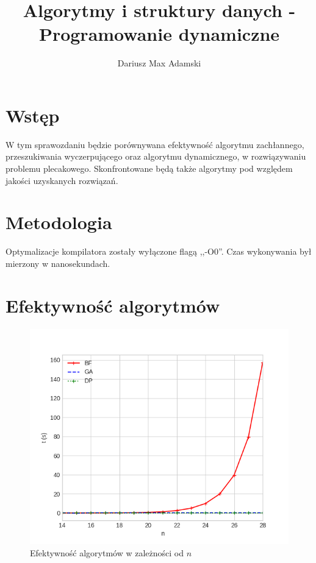\documentclass[11pt,twocolumn]{article}
\title{Algorytmy i struktury danych - Programowanie dynamiczne}
\author{Dariusz Max Adamski}
\date{}
\begin{document}
\maketitle


\section*{Wstęp}

W tym sprawozdaniu będzie porównywana efektywność algorytmu zachłannego,
przeszukiwania wyczerpującego oraz algorytmu dynamicznego,
w rozwiązywaniu problemu plecakowego.
Skonfrontowane będą także algorytmy pod względem jakości uzyskanych rozwiązań.


\section*{Metodologia}

Optymalizacje kompilatora zostały wyłączone flagą ,,-O0''. 
Czas wykonywania był mierzony w nanosekundach.


\section{Efektywność algorytmów}

\begin{figure}[h]
	\includegraphics[width=\linewidth]{speed-n.png}
	\caption{Efektywność algorytmów w zależności od $n$ \label{speed_n}}
\end{figure}
\end{document}
